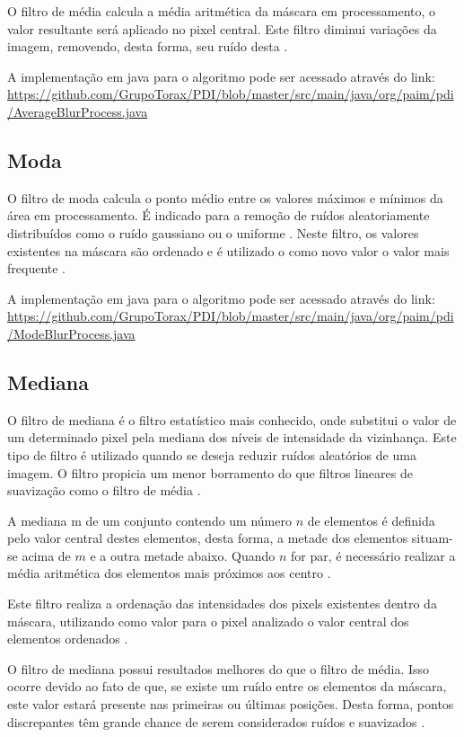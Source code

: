 \documentclass[
	12pt,				%
	oneside,			%
	a4paper,			%
	english,			%
	french,				%
	spanish,			%
	brazil,				%
	]{abntex2}
\begin{document}
O filtro de média calcula a média aritmética da máscara em processamento, o valor resultante será aplicado no pixel central. Este filtro diminui variações da imagem, removendo, desta forma, seu ruído desta \cite{gonzalesWoods:2008}.

A implementação em java para o algoritmo pode ser acessado através do link: \url{https://github.com/GrupoTorax/PDI/blob/master/src/main/java/org/paim/pdi/AverageBlurProcess.java} 

\subsection{Moda}
O filtro de moda calcula o ponto médio entre os valores máximos e mínimos da área em processamento. É indicado para a remoção de ruídos aleatoriamente distribuídos como o ruído gaussiano ou o uniforme \cite{gonzalesWoods:2008}. Neste filtro, os valores existentes na máscara são ordenado e é utilizado o como novo valor o valor mais frequente \cite{conciAzevedoLeta:2008}.

A implementação em java para o algoritmo pode ser acessado através do link:
\url{https://github.com/GrupoTorax/PDI/blob/master/src/main/java/org/paim/pdi/ModeBlurProcess.java}

\subsection{Mediana}

O filtro de mediana é o filtro estatístico mais conhecido, onde substitui o valor de um determinado pixel pela mediana dos níveis de intensidade da vizinhança. Este tipo de filtro é utilizado quando se deseja reduzir ruídos aleatórios de uma imagem. O filtro propicia um menor borramento do que filtros lineares de suavização como o filtro de média \cite{gonzalesWoods:2008}.

A mediana m de um conjunto contendo um número \(n\) de elementos é definida pelo valor central destes elementos, desta forma, a metade dos elementos situam-se acima de \(m\) e a outra metade abaixo. Quando \(n\) for par, é necessário realizar a média aritmética dos elementos mais próximos aos centro \cite{conciAzevedoLeta:2008}.

Este filtro realiza a ordenação das intensidades dos pixels existentes dentro da máscara, utilizando como valor para o pixel analizado o valor central dos elementos ordenados \cite{conciAzevedoLeta:2008}.

O filtro de mediana possui resultados melhores do que o filtro de média. Isso ocorre devido ao fato de que, se existe um ruído entre os elementos da máscara, este valor estará presente nas primeiras ou últimas posições. Desta forma, pontos discrepantes têm grande chance de serem considerados ruídos e suavizados \cite{conciAzevedoLeta:2008}.
\end{document}
